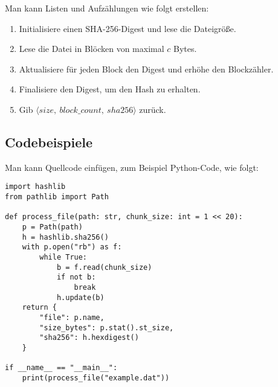 Man kann Listen und Aufzählungen wie folgt erstellen:

\begin{enumerate}
  \item Initialisiere einen SHA-256-Digest und lese die Dateigröße.
  \item Lese die Datei in Blöcken von maximal $c$ Bytes.
  \item Aktualisiere für jeden Block den Digest und erhöhe den Blockzähler.
  \item Finalisiere den Digest, um den Hash zu erhalten.
  \item Gib $\langle size,\ block\_count,\ sha256 \rangle$ zurück.
\end{enumerate}

\subsection{Codebeispiele}

Man kann Quellcode einfügen, zum Beispiel Python-Code, wie folgt:

\begin{lstlisting}[float=htb, caption={Quellcode des Dateiverarbeitungsalgorithmus.}, label={lst:filehash}]
import hashlib
from pathlib import Path

def process_file(path: str, chunk_size: int = 1 << 20):
    p = Path(path)
    h = hashlib.sha256()
    with p.open("rb") as f:
        while True:
            b = f.read(chunk_size)
            if not b:
                break
            h.update(b)
    return {
        "file": p.name,
        "size_bytes": p.stat().st_size,
        "sha256": h.hexdigest()
    }

if __name__ == "__main__":
    print(process_file("example.dat"))
\end{lstlisting}
